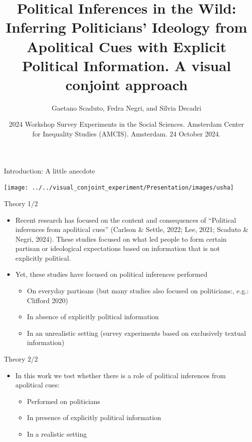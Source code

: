 \documentclass[
  ignorenonframetext,
]{beamer}
\title{Political Inferences in the Wild: Inferring Politicians' Ideology
from Apolitical Cues with Explicit Political Information. A visual
conjoint approach}
\author{Gaetano Scaduto\inst{1}, Fedra Negri\inst{1}, and Silvia
Decadri\inst{1}}
\date{2024 Workshop Survey Experiments in the Social Sciences. Amsterdam
Center for Inequality Studies (AMCIS). Amsterdam. 24 October 2024.}
\institute{\inst{1}University of Milan Bicocca,}
\providecommand{\tightlist}{%
  \setlength{\itemsep}{0pt}\setlength{\parskip}{0pt}}
\begin{document}
\frame{\titlepage}

\begin{frame}{Introduction: A little anecdote}
\label{introduction-a-little-anecdote}
\begin{center}\texttt{[image: ../../visual\_conjoint\_experiment/Presentation/images/usha]} \end{center}
\end{frame}

\begin{frame}{Theory 1/2}
\label{theory-12}
\begin{itemize}
\item
  Recent research has focused on the content and consequences of
  ``Political inferences from apolitical cues'' (Carlson \& Settle,
  2022; Lee, 2021; Scaduto \& Negri, 2024). These studies focused on
  what led people to form certain partisan or ideological expectations
  based on information that is not explicitly political.
\item
  Yet, these studies have focused on political inferences performed

  \begin{itemize}
  \tightlist
  \item
    On everyday partisans (but many studies also focused on
    politicians:, e.g.: Clifford 2020)
  \item
    In absence of explicitly political information
  \item
    In an unrealistic setting (survey experiments based on exclusively
    textual information)
  \end{itemize}
\end{itemize}
\end{frame}

\begin{frame}{Theory 2/2}
\label{theory-22}
\begin{itemize}
\tightlist
\item
  In this work we test whether there is a role of political inferences
  from apolitical cues:

  \begin{itemize}
  \tightlist
  \item
    Performed on politicians
  \item
    In presence of explicitly political information
  \item
    In a realistic setting
  \end{itemize}
\end{itemize}
\end{frame}
\end{document}

